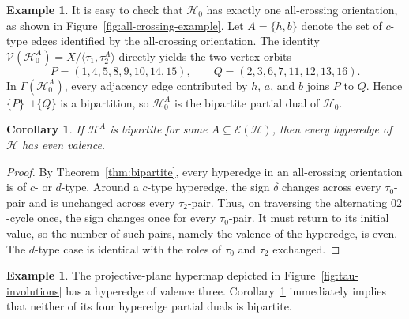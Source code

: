 \documentclass[10pt,a4paper]{article}
\newtheorem{corollary}[theorem]{Corollary}
\theoremstyle{definition}
\newtheorem{example}[theorem]{Example}
\theoremstyle{remark}
\newcommand{\Hcal}{\mathcal{H}}
\newcommand{\Ecal}{\mathcal{E}}
\begin{document}
\begin{example}\label{ex:mixed-partials}
It is easy to check that $\Hcal_0$ has exactly one all-crossing orientation, as shown in Figure~\ref{fig:all-crossing-example}.
Let $A=\{h,b\}$ denote the set of $c$-type edges identified by the all-crossing orientation. The identity $\mathcal V(\Hcal_0^A)=X/\langle\tau_1,\tau_2^A\rangle$ directly yields the two vertex orbits
\[
 P=(1,4,5,8,9,10,14,15),\qquad
 Q=(2,3,6,7,11,12,13,16).
\]
In $\Gamma(\Hcal_0^A)$, every adjacency edge contributed by $h$, $a$, and $b$ joins $P$ to $Q$. Hence $\{P\}\sqcup\{Q\}$ is a bipartition, so $\Hcal_0^A$ is the bipartite partial dual of $\Hcal_0$.
\end{example}

\begin{corollary}\label{cor:even-obstruction}
If $\Hcal^A$ is bipartite for some $A\subseteq\Ecal(\Hcal)$, then every hyperedge of $\Hcal$ has even valence.
\end{corollary}

\begin{proof}
By Theorem~\ref{thm:bipartite}, every hyperedge in an all-crossing orientation is of $c$- or $d$-type. Around a $c$-type hyperedge, the sign $\delta$ changes across every $\tau_0$-pair and is unchanged across every $\tau_2$-pair. Thus, on traversing the alternating $02$-cycle once, the sign changes once for every $\tau_0$-pair. It must return to its initial value, so the number of such pairs, namely the valence of the hyperedge, is even. The $d$-type case is identical with the roles of $\tau_0$ and $\tau_2$ exchanged.
\end{proof}

\begin{example}\label{ex:odd-hyperedge}
The projective-plane hypermap depicted in Figure~\ref{fig:tau-involutions} has a hyperedge of valence three. Corollary~\ref{cor:even-obstruction} immediately implies that neither of its four hyperedge partial duals is bipartite.
\end{example}
\end{document}
